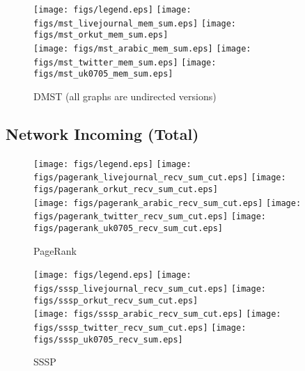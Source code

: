\documentclass{article}
\newcommand{\bline}[1][1]{\vspace{#1\baselineskip}}
\begin{document}
\begin{figure}[!h]
  \bline[3.5]
  \centering
  \texttt{[image: figs/legend.eps]}\hspace{3em}%
  \texttt{[image: figs/mst\_livejournal\_mem\_sum.eps]}\hspace{1em}%
  \texttt{[image: figs/mst\_orkut\_mem\_sum.eps]}\\
  \texttt{[image: figs/mst\_arabic\_mem\_sum.eps]}\hspace{1em}%
  \texttt{[image: figs/mst\_twitter\_mem\_sum.eps]}\hspace{1em}%
  \texttt{[image: figs/mst\_uk0705\_mem\_sum.eps]}
  \caption{DMST (all graphs are undirected versions)}
\end{figure}

\pagebreak
\subsection{Network Incoming (Total)}
\begin{figure}[!h]
  \bline[1]
  \centering
  \texttt{[image: figs/legend.eps]}\hspace{3em}%
  \texttt{[image: figs/pagerank\_livejournal\_recv\_sum\_cut.eps]}\hspace{1em}%
  \texttt{[image: figs/pagerank\_orkut\_recv\_sum\_cut.eps]}\\
  \texttt{[image: figs/pagerank\_arabic\_recv\_sum\_cut.eps]}\hspace{1em}%
  \texttt{[image: figs/pagerank\_twitter\_recv\_sum\_cut.eps]}\hspace{1em}%
  \texttt{[image: figs/pagerank\_uk0705\_recv\_sum\_cut.eps]}
  \caption{PageRank}
\end{figure}

\begin{figure}[!h]
  \bline[3.5]
  \centering
  \texttt{[image: figs/legend.eps]}\hspace{3em}%
  \texttt{[image: figs/sssp\_livejournal\_recv\_sum\_cut.eps]}\hspace{1em}%
  \texttt{[image: figs/sssp\_orkut\_recv\_sum\_cut.eps]}\\
  \texttt{[image: figs/sssp\_arabic\_recv\_sum\_cut.eps]}\hspace{1em}%
  \texttt{[image: figs/sssp\_twitter\_recv\_sum\_cut.eps]}\hspace{1em}%
  \texttt{[image: figs/sssp\_uk0705\_recv\_sum.eps]}
  \caption{SSSP}
\end{figure}
\end{document}
